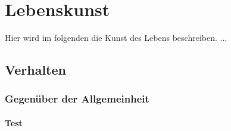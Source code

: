 \chapter{Lebenskunst} 
\begin{thesis_quotation}
\end{thesis_quotation}
Hier wird im folgenden die Kunst des Lebens beschreiben. ...
\section{Verhalten}
\subsection{Gegenüber der Allgemeinheit}
\subsubsection{Test}
